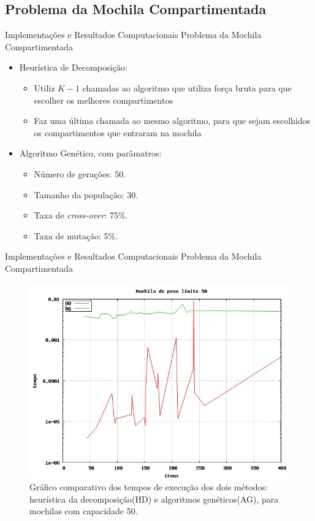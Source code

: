 \documentclass[slidestop,compress,mathserif]{beamer}
\begin{document}
\subsection{Problema da Mochila Compartimentada}
\begin{frame} {Implementações e Resultados Computacionais} {Problema da Mochila Compartimentada}

\begin{itemize} 
 \item Heurística de Decomposição:
\begin{itemize}
 \item Utiliz $K - 1$ chamadas ao algoritmo que utiliza força bruta para que escolher os melhores compartimentos
 \item Faz uma última chamada ao mesmo algoritmo, para que sejam escolhidos os compartimentos que entraram na mochila
\end{itemize}
\item Algoritmo Genético, com parâmatros: 

\begin{itemize}
	\item Número de gerações: 50.
	\item Tamanho da população: 30.
	\item Taxa de \textit{cross-over}: 75\%.
	\item Taxa de mutação: 5\%.
\end{itemize}

\end{itemize}


\end{frame}


\begin{frame} {Implementações e Resultados Computacionais} {Problema da Mochila Compartimentada}

\scriptsize
\begin{figure}[htp]
	\centering
	\includegraphics[scale=0.3]{images/com_w50.jpg}
	\caption{\tiny{Gráfico comparativo dos tempos de execução dos dois métodos: heurística da decomposição(HD) e algoritmos genéticos(AG), para mochilas com capacidade 50.}}
	\label{fig:com_w50}
\end{figure}

\end{frame}
\end{document}
